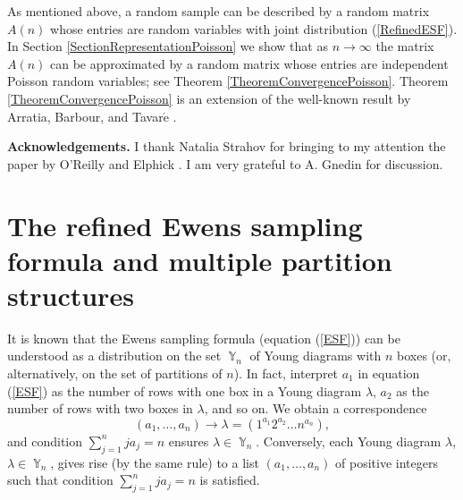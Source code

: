 \documentclass[12pt]{amsart}
\theoremstyle{definition}
\numberwithin{equation}{section}
\DeclareMathOperator{\Y}{\mathbb{Y}}
\begin{document}
As mentioned above, a random sample can be described by a random matrix $A(n)$ whose entries are random variables with joint distribution (\ref{RefinedESF}). In Section \ref{SectionRepresentationPoisson} we show that as $n\rightarrow\infty$ the matrix $A(n)$ can be approximated by a random matrix whose entries are independent Poisson random variables; see Theorem
\ref{TheoremConvergencePoisson}. Theorem \ref{TheoremConvergencePoisson} is an extension
of the well-known result by Arratia, Barbour, and Tavar$\acute{\mbox{e}}$ \cite{ArratiaBarbourTavarePoisson}.

\textbf{Acknowledgements.} I thank Natalia Strahov for bringing to my attention the paper by O'Reilly and Elphick \cite{ReillyElphick}. I am very grateful to A. Gnedin for discussion.
\section{The refined Ewens sampling formula and multiple partition structures}\label{SectionRESFMPS}
It is known that the Ewens sampling formula (equation (\ref{ESF})) can be understood as a distribution on the set $\Y_n$
of Young diagrams with $n$ boxes (or, alternatively, on the set of partitions of $n$). In fact, interpret
$a_1$ in equation (\ref{ESF}) as the number of rows with one box in a Young diagram $\lambda$, $a_2$ as the number
of rows with two boxes in $\lambda$, and so on. We obtain a correspondence
$$
\left(a_1,\ldots,a_n\right)\longrightarrow \lambda=\left(1^{a_1}2^{a_2}\ldots n^{a_n}\right),
$$
and condition $\sum_{j=1}^nja_j=n$ ensures $\lambda\in\Y_n$. Conversely, each Young diagram $\lambda$, $\lambda\in\Y_n$, gives rise (by the same rule) to a list $(a_1,\ldots,a_n)$ of positive integers such that  condition $\sum_{j=1}^nja_j=n$ is satisfied.
\end{document}
